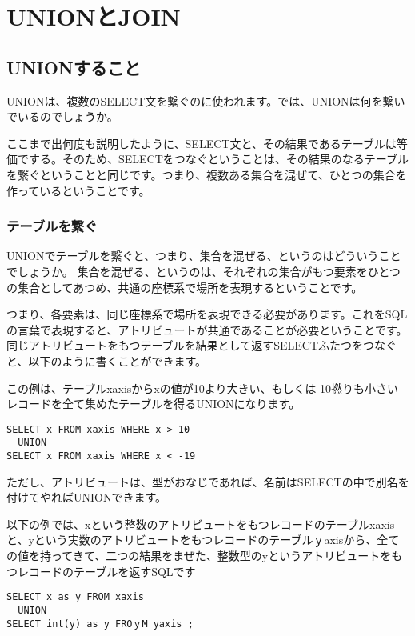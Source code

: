 \chapter{UNIONとJOIN}

\section{UNIONすること}

UNIONは、複数のSELECT文を繋ぐのに使われます。では、UNIONは何を繋いでいるのでしょうか。

ここまで出何度も説明したように、SELECT文と、その結果であるテーブルは等価でする。そのため、SELECTをつなぐということは、その結果のなるテーブルを繋ぐということと同じです。つまり、複数ある集合を混ぜて、ひとつの集合を作っているということです。

\subsection{テーブルを繋ぐ}

UNIONでテーブルを繋ぐと、つまり、集合を混ぜる、というのはどういうことでしょうか。
集合を混ぜる、というのは、それぞれの集合がもつ要素をひとつの集合としてあつめ、共通の座標系で場所を表現するということです。

つまり、各要素は、同じ座標系で場所を表現できる必要があります。これをSQLの言葉で表現すると、アトリビュートが共通であることが必要ということです。同じアトリビュートをもつテーブルを結果として返すSELECTふたつをつなぐと、以下のように書くことができます。

この例は、テーブルxaxisからxの値が10より大きい、もしくは-10撚りも小さいレコードを全て集めたテーブルを得るUNIONになります。

\begin{verbatim}
SELECT x FROM xaxis WHERE x > 10
  UNION
SELECT x FROM xaxis WHERE x < -19
\end{verbatim}

ただし、アトリビュートは、型がおなじであれば、名前はSELECTの中で別名を付けてやればUNIONできます。

以下の例では、xという整数のアトリビュートをもつレコードのテーブルxaxisと、yという実数のアトリビュートをもつレコードのテーブルｙaxisから、全ての値を持ってきて、二つの結果をまぜた、整数型のyというアトリビュートをもつレコードのテーブルを返すSQLです

\begin{verbatim}
SELECT x as y FROM xaxis
  UNION
SELECT int(y) as y FROｙM yaxis ;
\end{verbatim}


